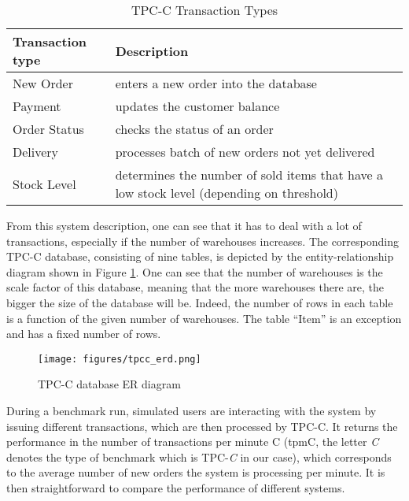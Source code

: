 \begin{table}[h]
	\centering
	\begin{tabular}{|m{4cm}|m{9cm}|}
		\hline
		\textbf{Transaction type} & \textbf{Description}\\
		\hline
		New Order & enters a new order into the database\\
		\hline
		Payment & updates the customer balance\\
		\hline
		Order Status & checks the status of an order\\
		\hline
		Delivery & processes batch of new orders not yet delivered\\
		\hline
		Stock Level & determines the number of sold items that have a low stock level (depending on threshold)\\
		\hline
	\end{tabular}
	\caption{TPC-C Transaction Types}
	\label{table:tpcc_trans_type_list}
\end{table}

From this system description, one can see that it has to deal with a lot of transactions, especially if the number of warehouses increases.
The corresponding TPC-C database, consisting of nine tables, is depicted by the entity-relationship diagram shown in Figure \ref{fig:tpcc_erd}.
One can see that the number of warehouses is the scale factor of this database, meaning that the more warehouses there are, the bigger the size of the database will be.
Indeed, the number of rows in each table is a function of the given number of warehouses.
The table ``Item'' is an exception and has a fixed number of rows.

\begin{figure}[h]
	\centering
	\texttt{[image: figures/tpcc\_erd.png]}
	\caption{TPC-C database ER diagram \cite[p. 11]{tpcc10}}
	\label{fig:tpcc_erd}
\end{figure}

During a benchmark run, simulated users are interacting with the system by issuing different transactions, which are then processed by TPC-C.
It returns the performance in the number of transactions per minute C (tpmC, the letter \textit{C} denotes the type of benchmark which is TPC-\textit{C} in our case), which corresponds to the average number of new orders the system is processing per minute.
It is then straightforward to compare the performance of different systems.




